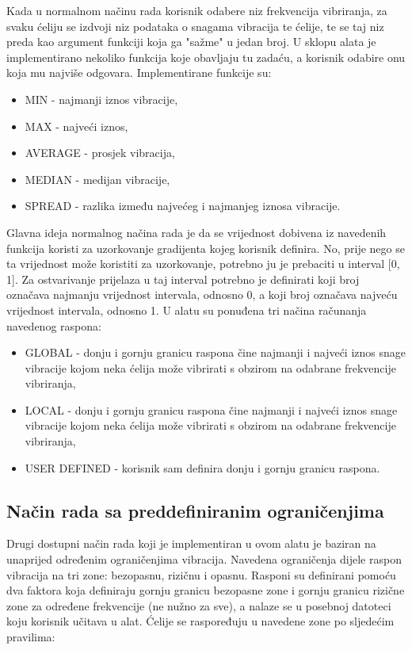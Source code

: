 \documentclass[times, utf8, diplomski]{fer}
\begin{document}
Kada u normalnom načinu rada korisnik odabere niz frekvencija vibriranja, za svaku ćeliju se izdvoji niz podataka o snagama vibracija te ćelije, te se taj niz preda kao argument funkciji koja ga "sažme" u jedan broj. U sklopu alata je implementirano nekoliko funkcija koje obavljaju tu zadaću, a korisnik odabire onu koja mu najviše odgovara. Implementirane funkcije su:

\begin{itemize}
\item MIN - najmanji iznos vibracije,
\item MAX - najveći iznos,
\item AVERAGE - prosjek vibracija,
\item MEDIAN - medijan vibracije,
\item SPREAD - razlika između najvećeg i najmanjeg iznosa vibracije.\\
\end{itemize}

Glavna ideja normalnog načina rada je da se vrijednost dobivena iz navedenih funkcija koristi za uzorkovanje gradijenta kojeg korisnik definira. No, prije nego se ta vrijednost može koristiti za uzorkovanje, potrebno ju je prebaciti u interval [0, 1]. Za ostvarivanje prijelaza u taj interval potrebno je definirati koji broj označava najmanju vrijednost intervala, odnosno 0, a koji broj označava najveću vrijednost intervala, odnosno 1. U alatu su ponuđena tri načina računanja navedenog raspona:

\begin{itemize}
\item GLOBAL - donju i gornju granicu raspona čine najmanji i najveći iznos snage vibracije kojom neka ćelija može vibrirati s obzirom na odabrane frekvencije vibriranja,
\item LOCAL - donju i gornju granicu raspona čine najmanji i najveći iznos snage vibracije kojom neka ćelija može vibrirati s obzirom na odabrane frekvencije vibriranja,
\item USER DEFINED - korisnik sam definira donju i gornju granicu raspona.\\
\end{itemize}

\subsection{Način rada sa preddefiniranim ograničenjima}

Drugi dostupni način rada koji je implementiran u ovom alatu je baziran na unaprijed određenim ograničenjima vibracija. Navedena ograničenja dijele raspon vibracija na tri zone: bezopasnu, rizičnu i opasnu. Rasponi su definirani pomoću dva faktora koja definiraju gornju granicu bezopasne zone i gornju granicu rizične zone za određene frekvencije (ne nužno za sve), a nalaze se u posebnoj datoteci koju korisnik učitava u alat. Ćelije se raspoređuju u navedene zone po sljedećim pravilima:
\end{document}
